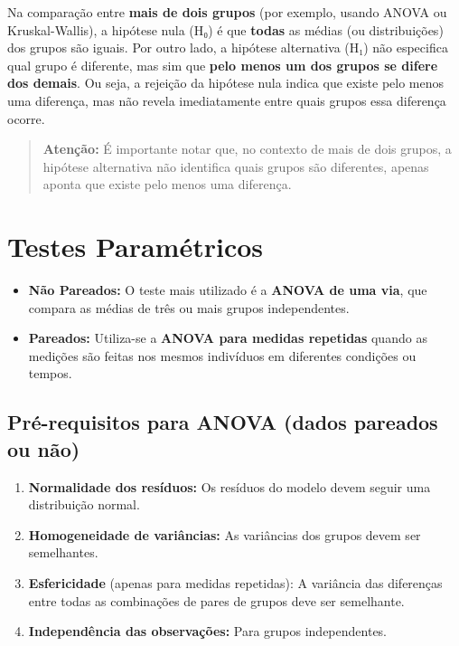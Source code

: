 \documentclass[
]{book}
\providecommand{\tightlist}{%
  \setlength{\itemsep}{0pt}\setlength{\parskip}{0pt}}
\begin{document}
Na comparação entre \textbf{mais de dois grupos} (por exemplo, usando ANOVA ou Kruskal-Wallis), a hipótese nula (H₀) é que \textbf{todas} as médias (ou distribuições) dos grupos são iguais. Por outro lado, a hipótese alternativa (H₁) não especifica qual grupo é diferente, mas sim que \textbf{pelo menos um dos grupos se difere dos demais}. Ou seja, a rejeição da hipótese nula indica que existe pelo menos uma diferença, mas não revela imediatamente entre quais grupos essa diferença ocorre.

\begin{quote}
\textbf{Atenção:} É importante notar que, no contexto de mais de dois grupos, a hipótese alternativa não identifica quais grupos são diferentes, apenas aponta que existe pelo menos uma diferença.
\end{quote}

\section{Testes Paramétricos}\label{testes-paramuxe9tricos}

\begin{itemize}
\tightlist
\item
  \textbf{Não Pareados:} O teste mais utilizado é a \textbf{ANOVA de uma via}, que compara as médias de três ou mais grupos independentes.
\item
  \textbf{Pareados:} Utiliza-se a \textbf{ANOVA para medidas repetidas} quando as medições são feitas nos mesmos indivíduos em diferentes condições ou tempos.
\end{itemize}

\subsection{Pré-requisitos para ANOVA (dados pareados ou não)}\label{pruxe9-requisitos-para-anova-dados-pareados-ou-nuxe3o}

\begin{enumerate}
\def\labelenumi{\arabic{enumi}.}
\tightlist
\item
  \textbf{Normalidade dos resíduos:} Os resíduos do modelo devem seguir uma distribuição normal.
\item
  \textbf{Homogeneidade de variâncias:} As variâncias dos grupos devem ser semelhantes.
\item
  \textbf{Esfericidade} (apenas para medidas repetidas): A variância das diferenças entre todas as combinações de pares de grupos deve ser semelhante.
\item
  \textbf{Independência das observações:} Para grupos independentes.
\end{enumerate}
\end{document}
